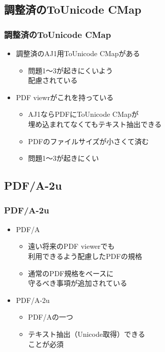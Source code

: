 \subsection{調整済のToUnicode CMap}
\begin{frame}\frametitle{調整済のToUnicode CMap}
  \begin{itemize}
  \item 調整済のAJ1用ToUnicode CMapがある
    \begin{itemize}
    \item 問題1～3が起きにくいよう \\
      配慮されている
    \end{itemize}
  \item PDF viewrがこれを持っている
    \begin{itemize}
    \item AJ1ならPDFにToUnicode CMapが \\
      埋め込まれてなくてもテキスト抽出できる
    \item PDFのファイルサイズが小さくて済む
    \item 問題1～3が起きにくい
    \end{itemize}
  \end{itemize}
\end{frame}

\subsection{PDF/A-2u}
\begin{frame}\frametitle{PDF/A-2u}
  \begin{itemize}
  \item PDF/A
    \begin{itemize}
    \item 遠い将来のPDF viewerでも \\
      利用できるよう配慮したPDFの規格
    \item 通常のPDF規格をベースに \\
      守るべき事項が追加されている
    \end{itemize}
  \item PDF/A-2u
    \begin{itemize}
    \item PDF/Aの一つ
    \item テキスト抽出（Unicode取得）できる \\
      ことが必須
    \end{itemize}
  \end{itemize}
\end{frame}

